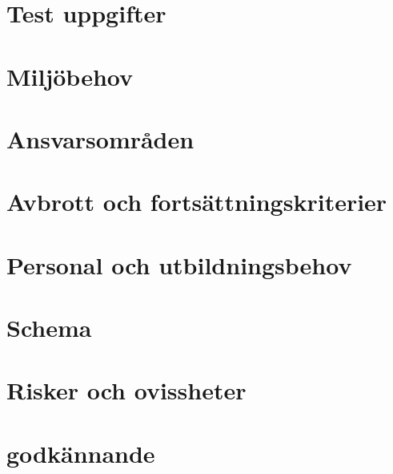 \documentclass[10pt]{article}
\begin{document}
\section{Test uppgifter}
\section{Miljöbehov}
\section{Ansvarsområden}
\section{Avbrott och fortsättningskriterier}
\section{Personal och utbildningsbehov}
\section{Schema}
\section{Risker och ovissheter}
\section{godkännande}
\end{document}
